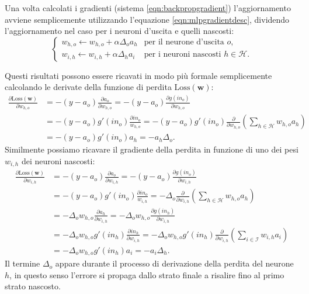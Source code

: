\documentclass[../../main.tex]{subfiles}
\begin{document}
Una volta calcolati i gradienti (sistema \ref{eqn:backpropgradient}) l'aggiornamento avviene semplicemente utilizzando l'equazione \ref{eqn:mlpgradientdesc}, dividendo l'aggiornamento nel caso per i neuroni d'uscita e quelli nascosti:
\begin{equation}
    \begin{cases}
        w_{h,o} \leftarrow w_{h,o} + \alpha \Delta_o a_h & \text{per il neurone d'uscita } o,\\
        w_{i,h} \leftarrow w_{i,h} + \alpha \Delta_h a_i & \text{per i neuroni nascosti } h \in \mathcal{H}.
    \end{cases}
\end{equation}

Questi risultati possono essere ricavati in modo più formale semplicemente calcolando le derivate della funzione di perdita $\mathrm{Loss}(\mathbf{w})$:
\begin{equation}
    \begin{aligned}
        \frac{\partial \mathrm{Loss}(\boldsymbol{w})}{\partial w_{h,o}} &= -(y - a_o) \frac{\partial a_o}{\partial w_{h,o}} = -(y - a_o) \frac{\partial g(in_o)}{\partial w_{h,o}}\\
        & = -(y - a_o)g'(in_o)\frac{\partial in_o}{w_{h,o}} = -(y - a_o)g'(in_o) \frac{\partial}{\partial w_{h,o}}\left(\sum_{h \in \mathcal{H}} w_{h,o} a_h \right)\\
        & = -(y - a_o)g'(in_o) a_h = -a_h \Delta_o.        
    \end{aligned}
\end{equation}
Similmente possiamo ricavare il gradiente della perdita in funzione di uno dei pesi $w_{i,h}$ dei neuroni nascosti:
\begin{equation}
    \begin{aligned}
        \frac{\partial \mathrm{Loss}(\boldsymbol{w})}{\partial w_{i,h}} &= -(y - a_o) \frac{\partial a_o}{\partial w_{i,h}} = -(y - a_o) \frac{\partial g(in_o)}{\partial w_{i,h}}\\
        &= -(y - a_o)g'(in_o)\frac{\partial in_o}{w_{i,h}} = -\Delta_o \frac{\partial}{\partial w_{i,h}}\left(\sum_{h \in \mathcal{H}} w_{h,o} a_h \right) \\
        &= -\Delta_o w_{h,o} \frac{\partial a_h}{\partial w_{i,h}} = -\Delta_o w_{h,o} \frac{\partial g(in_h)}{\partial w_{i,h}} \\
        &= - \Delta_o w_{h,o} g'(in_h) \frac{\partial in_h}{\partial w_{i,h}} = -\Delta_o w_{h,o} g'(in_h) \frac{\partial}{\partial w_{i,h}} \left(\sum_{i \in \mathcal{I}} w_{i,h} a_i\right)\\
        &= -\Delta_o w_{h,o} g'(in_h) a_i = -a_i \Delta_h.
    \end{aligned}
\end{equation}
Il termine $\Delta_o$ appare durante il processo di derivazione della perdita  del neurone $h$, in questo senso l'errore si propaga dallo strato finale a risalire fino al primo strato nascosto.
\end{document}
